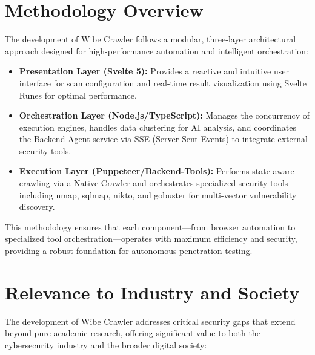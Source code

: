 \documentclass[12pt,oneside,a4paper]{book}
\begin{document}
\section{Methodology Overview}
The development of Wibe Crawler follows a modular, three-layer architectural approach designed for high-performance automation and intelligent orchestration:
\begin{itemize}
    \item \textbf{Presentation Layer (Svelte 5):} Provides a reactive and intuitive user interface for scan configuration and real-time result visualization using Svelte Runes for optimal performance.
    \item \textbf{Orchestration Layer (Node.js/TypeScript):} Manages the concurrency of execution engines, handles data clustering for AI analysis, and coordinates the Backend Agent service via SSE (Server-Sent Events) to integrate external security tools.
    \item \textbf{Execution Layer (Puppeteer/Backend-Tools):} Performs state-aware crawling via a Native Crawler and orchestrates specialized security tools including nmap, sqlmap, nikto, and gobuster for multi-vector vulnerability discovery.
\end{itemize}
This methodology ensures that each component—from browser automation to specialized tool orchestration—operates with maximum efficiency and security, providing a robust foundation for autonomous penetration testing.

\section{Relevance to Industry and Society}
The development of Wibe Crawler addresses critical security gaps that extend beyond pure academic research, offering significant value to both the cybersecurity industry and the broader digital society:
\end{document}

